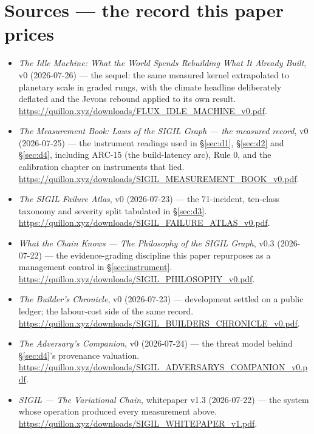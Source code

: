 \documentclass[11pt,a4paper]{article}
\begin{document}
\section*{Sources --- the record this paper prices}
\label{sec:sources}
\small
\begin{itemize}[leftmargin=1.2em,itemsep=1pt]
\item \emph{The Idle Machine: What the World Spends Rebuilding What It Already Built}, v0 (2026-07-26) --- the sequel: the same measured kernel extrapolated to planetary scale in graded rungs, with the climate headline deliberately deflated and the Jevons rebound applied to its own result. \url{https://quillon.xyz/downloads/FLUX_IDLE_MACHINE_v0.pdf}.
\item \emph{The Measurement Book: Laws of the SIGIL Graph --- the measured record}, v0 (2026-07-25) --- the instrument readings used in \S\ref{sec:d1}, \S\ref{sec:d2} and \S\ref{sec:d4}, including ARC-15 (the build-latency arc), Rule 0, and the calibration chapter on instruments that lied. \url{https://quillon.xyz/downloads/SIGIL_MEASUREMENT_BOOK_v0.pdf}.
\item \emph{The SIGIL Failure Atlas}, v0 (2026-07-23) --- the 71-incident, ten-class taxonomy and severity split tabulated in \S\ref{sec:d3}. \url{https://quillon.xyz/downloads/SIGIL_FAILURE_ATLAS_v0.pdf}.
\item \emph{What the Chain Knows --- The Philosophy of the SIGIL Graph}, v0.3 (2026-07-22) --- the evidence-grading discipline this paper repurposes as a management control in \S\ref{sec:instrument}. \url{https://quillon.xyz/downloads/SIGIL_PHILOSOPHY_v0.pdf}.
\item \emph{The Builder's Chronicle}, v0 (2026-07-23) --- development settled on a public ledger; the labour-cost side of the same record. \url{https://quillon.xyz/downloads/SIGIL_BUILDERS_CHRONICLE_v0.pdf}.
\item \emph{The Adversary's Companion}, v0 (2026-07-24) --- the threat model behind \S\ref{sec:d4}'s provenance valuation. \url{https://quillon.xyz/downloads/SIGIL_ADVERSARYS_COMPANION_v0.pdf}.
\item \emph{SIGIL --- The Variational Chain}, whitepaper v1.3 (2026-07-22) --- the system whose operation produced every measurement above. \url{https://quillon.xyz/downloads/SIGIL_WHITEPAPER_v1.pdf}.
\end{itemize}
\end{document}
